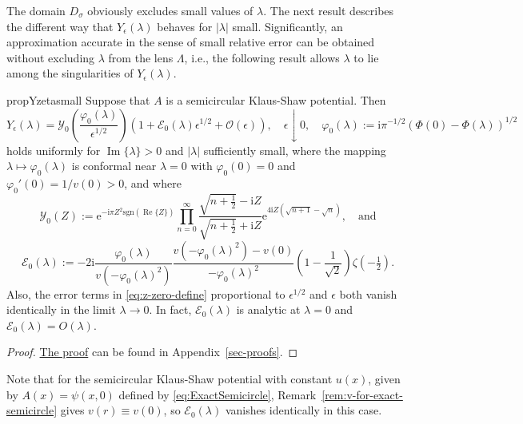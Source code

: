 \documentclass[12pt]{amsart}
\numberwithin{equation}{section}
\newcommand{\ee}{\mathrm{e}}
\newcommand{\ii}{\mathrm{i}}
\newcommand{\SP}{\lambda}
\newcommand{\phaseint}{\Phi}
\newcommand{\rr}{r}
\newcommand{\bigo}[1]{ \mathcal{O}\! \left( #1 \right) }
\DeclareMathOperator{\imag}{Im}
\DeclareMathOperator{\re}{Re}
\begin{document}
The domain $D_\sigma$ obviously excludes small values of $\SP$.  The next result describes the different way that $Y_\epsilon(\SP)$ behaves for $|\SP|$ small.  Significantly, an approximation accurate in the sense of small relative error can be obtained without excluding $\SP$ from the lens $\Lambda$, i.e., the following result allows $\SP$ to lie among the singularities of $Y_\epsilon(\SP)$.
\begin{restatable}[Asymptotic behavior of $Y_\epsilon(\SP)$ for $\SP\approx 0$]{prop}{Yzetasmall}
Suppose that $A$ is a semicircular Klaus-Shaw potential.
Then 
\begin{equation}
Y_\epsilon(\SP)=\mathcal{Y}_0\left(\frac{\varphi_0(\SP)}{\epsilon^{1/2}}\right)\left(1+\mathcal{E}_0(\SP)\epsilon^{1/2} + \bigo{\epsilon}\right),\quad\epsilon\downarrow 0,\quad \varphi_0(\SP):=\ii\pi^{-1/2}(\phaseint(0)-\phaseint(\SP))^{1/2}
\label{eq:z-zero-define}
\end{equation}
holds uniformly for $\imag\{\SP\}>0$ and $|\SP|$ sufficiently small,  
where the mapping $\SP\mapsto \varphi_0(\SP)$ is conformal near $\SP=0$ with $\varphi_0(0)=0$ and $\varphi_0'(0)=1/v(0)>0$, and where
\begin{equation}
\mathcal{Y}_0(Z):=\ee^{-\ii\pi Z^2\mathrm{sgn}(\re\{Z\})}\prod_{n=0}^\infty\frac{\displaystyle\sqrt{n+\tfrac{1}{2}}-\ii Z}{\displaystyle\sqrt{n+\tfrac{1}{2}}+\ii Z}\ee^{4\ii Z(\sqrt{n+1}-\sqrt{n})},\quad\text{and}
\label{eq:Y0-def}
\end{equation}
\begin{equation}
\mathcal{E}_0(\SP):=-2\ii\frac{\varphi_0(\SP)}{v(-\varphi_0(\SP)^2)}\frac{v(-\varphi_0(\SP)^2)-v(0)}{-\varphi_0(\SP)^2}\left(1-\frac{1}{\sqrt{2}}\right)\zeta(-\tfrac{1}{2}).
\label{eq:E0-define}
\end{equation}
Also, the error terms in \eqref{eq:z-zero-define} proportional to $\epsilon^{1/2}$ and $\epsilon$ both vanish identically in the limit $\SP\to 0$.  In fact, $\mathcal{E}_0(\lambda)$ is analytic at $\lambda=0$ and $\mathcal{E}_0(\lambda)=O(\lambda)$.
\label{prop:Y-zeta-small}
\end{restatable}

\begin{proof} \hyperlink{proof:Yzetasmall}{The proof} can be found in Appendix~\ref{sec-proofs}. \end{proof}

\begin{rem}
Note that for the semicircular Klaus-Shaw potential with constant $u(x)$, given by $A(x)=\psi(x,0)$ defined by \eqref{eq:ExactSemicircle}, Remark~\ref{rem:v-for-exact-semicircle} gives $v(\rr)\equiv v(0)$, so $\mathcal{E}_0(\SP)$ vanishes identically in this case.
\label{rem:exact-semicircle-term-vanishes}
\end{rem}
\end{document}
